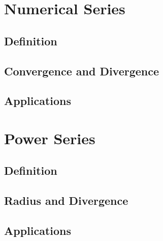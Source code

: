 \chapter{Numerical Series}\label{nseries}
\section{Definition}\label{nseries:def}
\section{Convergence and Divergence}\label{nseries:comp}
\section{Applications}\label{nseries:app}

\chapter{Power Series}\label{pseries}
\section{Definition}\label{pseries:def}
\section{Radius and Divergence}\label{pseries:comp}
\section{Applications}\label{pseries:app}